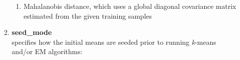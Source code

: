 \documentclass[10pt,a4paper]{article}
\begin{document}
\begin{small}
\begin{enumerate}[{$\bullet$}]
\begin{small}
\begin{enumerate}[{-}]
\begin{small}
\begin{enumerate}
\item Mahalanobis distance, which uses a global diagonal covariance matrix estimated from the given training samples
\end{enumerate}
\end{small}


\item
{\bf seed\_mode}\\
specifies how the initial means are seeded prior to running \mbox{{\it k}-means} and/or EM algorithms:



\end{enumerate}
\end{small}
\end{enumerate}
\end{small}
\end{document}
